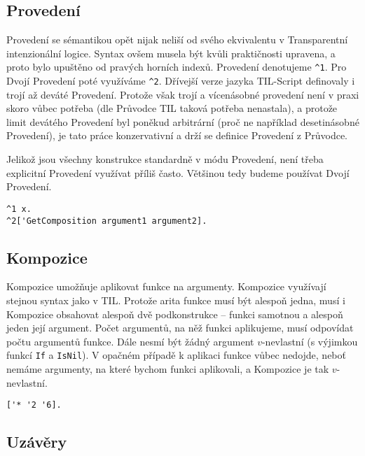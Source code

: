 \subsection{Provedení}

Provedení se sémantikou opět nijak neliší od svého ekvivalentu v Transparentní intenzionální
logice. Syntax ovšem musela být kvůli praktičnosti upravena, a proto bylo upuštěno od pravých
horních indexů. Provedení denotujeme \lstinline{^1}. Pro Dvojí Provedení poté využíváme
\lstinline{^2}. Dřívejší verze jazyka TIL-Script definovaly i trojí až deváté Provedení. Protože
však trojí a vícenásobné provedení není v praxi skoro vůbec potřeba (dle Průvodce TIL taková potřeba
nenastala), a protože limit devátého Provedení byl poněkud arbitrární (proč ne například
desetinásobné Provedení), je tato práce konzervativní a drží se definice Provedení z Průvodce.

Jelikož jsou všechny konstrukce standardně v módu Provedení, není třeba explicitní Provedení
využívat příliš často. Většinou tedy budeme používat Dvojí Provedení.

\begin{lstlisting}[caption={Příklad využití Provedení}]
^1 x.
^2['GetComposition argument1 argument2].
\end{lstlisting}

\subsection{Kompozice}

Kompozice umožňuje aplikovat funkce na argumenty. Kompozice využívají stejnou syntax jako v TIL.
Protože arita funkce musí být alespoň jedna, musí i Kompozice obsahovat alespoň dvě podkonstrukce
-- funkci samotnou a alespoň jeden její argument. Počet argumentů, na něž funkci aplikujeme, musí
odpovídat počtu argumentů funkce. Dále nesmí být žádný argument $v$-nevlastní (s výjimkou funkcí
\lstinline{If} a \lstinline{IsNil}). V opačném případě k aplikaci funkce vůbec nedojde, neboť
nemáme argumenty, na které bychom funkci aplikovali, a Kompozice je tak $v$-nevlastní.

\begin{lstlisting}[caption={Příklad využití Kompozice}]
['* '2 '6].
\end{lstlisting}

\subsection{Uzávěry}

